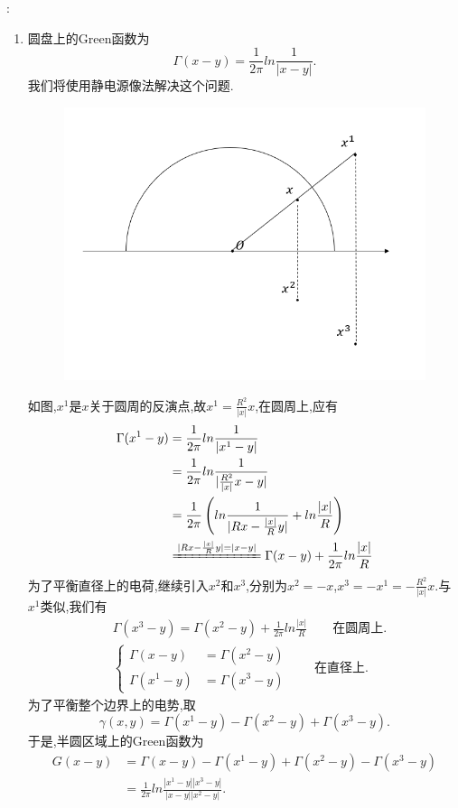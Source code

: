 \documentclass[12pt, a4paper]{ctexart}
\begin{document}
	\songti{}:\\
	
	\begin{enumerate}
		\item 圆盘上的Green函数为$$
		\Gamma(x-y)=\frac{1}{2\pi}ln \frac{1}{|x-y|}.	$$
		我们将使用静电源像法解决这个问题.
		\begin{figure}[htbp]
			\centering
			\includegraphics[scale=0.6]{PDE1_4_9_1.jpg}
		\end{figure}
		如图,$x^1$是$x$关于圆周的反演点,故$x^1=\frac{R^2}{|x|}x$,在圆周上,应有
		\begin{align*}
			\Gamma(x^1-y)&=\frac{1}{2\pi}ln \frac{1}{|x^1-y|}\\
			&=\frac{1}{2\pi}ln \frac{1}{|\frac{R^2}{|x|}x-y|}\\
			&=\frac{1}{2\pi} \left( ln \frac{1}{|Rx-\frac{|x|}{R}y|}+ln\frac{|x|}{R} \right)\\
			&\xlongequal{|Rx-\frac{|x|}{R}y|=|x-y|}\Gamma(x-y)+\frac{1}{2\pi}ln\frac{|x|}{R}
		\end{align*}
		为了平衡直径上的电荷,继续引入$x^2$和$x^3$,分别为$x^2=-x$,$x^3=-x^1=-\frac{R^2}{|x|}x$.与$x^1$类似,我们有
		\begin{align*}
			&\Gamma(x^3-y)=\Gamma(x^2-y)+\frac{1}{2\pi}ln\frac{|x|}{R} \qquad \text{在圆周上}.\\
			&\begin{cases}
			\Gamma(x-y)&=\Gamma(x^2-y) \\
			\Gamma(x^1-y)&=\Gamma(x^3-y)
			\end{cases}\qquad \text{在直径上}.
		\end{align*}
		为了平衡整个边界上的电势,取$$
		\gamma(x,y)=\Gamma(x^1-y)-\Gamma(x^2-y)+\Gamma(x^3-y).	$$
		于是,半圆区域上的Green函数为\begin{align*}
			G(x-y)&=\Gamma(x-y)-\Gamma(x^1-y)+\Gamma(x^2-y)-\Gamma(x^3-y)\\
			&=\frac{1}{2\pi}ln\frac{|x^1-y||x^3-y|}{|x-y||x^2-y|}.
		\end{align*}
			

\end{enumerate}
\end{document}
